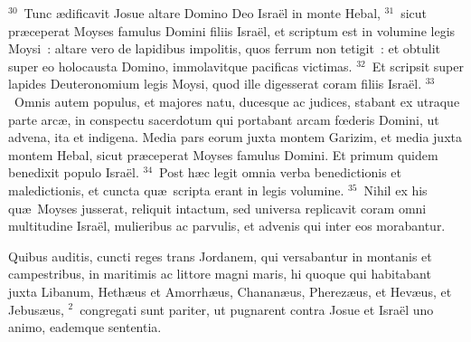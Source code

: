 ${}^{30}$~Tunc \ae dificavit Josue altare Domino Deo Isra\"el in monte Hebal,
${}^{31}$~sicut pr\ae ceperat Moyses famulus Domini filiis Isra\"el, et scriptum est in volumine legis Moysi~: altare vero de lapidibus impolitis, quos ferrum non tetigit~: et obtulit super eo holocausta Domino, immolavitque pacificas victimas.
${}^{32}$~Et scripsit super lapides Deuteronomium legis Moysi, quod ille digesserat coram filiis Isra\"el.
${}^{33}$~Omnis autem populus, et majores natu, ducesque ac judices, stabant ex utraque parte arc\ae , in conspectu sacerdotum qui portabant arcam fœderis Domini, ut advena, ita et indigena. Media pars eorum juxta montem Garizim, et media juxta montem Hebal, sicut pr\ae ceperat Moyses famulus Domini. Et primum quidem benedixit populo Isra\"el.
${}^{34}$~Post h\ae c legit omnia verba benedictionis et maledictionis, et cuncta qu\ae\ scripta erant in legis volumine.
${}^{35}$~Nihil ex his qu\ae\ Moyses jusserat, reliquit intactum, sed universa replicavit coram omni multitudine Isra\"el, mulieribus ac parvulis, et advenis qui inter eos morabantur.

\lettrine[lines=3,image=true,loversize=0.05,lraise=-0.03]{Q}{}uibus auditis, cuncti reges trans Jordanem, qui versabantur in montanis et campestribus, in maritimis ac littore magni maris, hi quoque qui habitabant juxta Libanum, Heth\ae us et Amorrh\ae us, Chanan\ae us, Pherez\ae us, et Hev\ae us, et Jebus\ae us,
${}^{2}$~congregati sunt pariter, ut pugnarent contra Josue et Isra\"el uno animo, eademque sententia.


